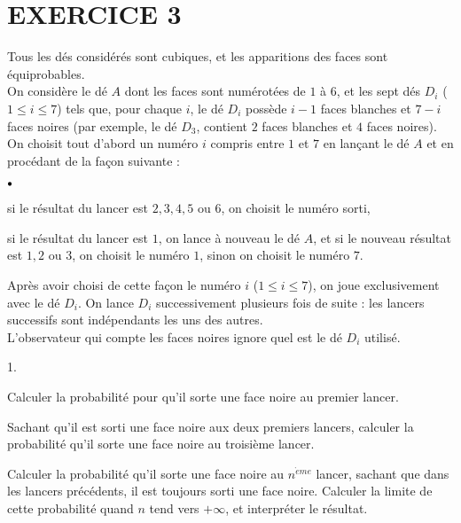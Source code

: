 \documentclass[11pt]{article}%
\begin{document}
\section*{EXERCICE 3}

Tous les dés considérés sont cubiques, et les apparitions des faces
sont équiprobables.\\
On considère le dé $A$ dont les faces sont numérotées de $1$ à $6$, et
les
sept dés $D_{i}$ ($1\leq i\leq 7$) tels que, pour chaque $i$, le dé
$D_{i}$ possède $i-1$ faces blanches et $7-i$ faces noires (par
exemple, le dé $D_{3}$, contient $2$ faces blanches et $4$ faces
noires).\\
On choisit tout d'abord un numéro $i$ compris entre $1$ et $7$ en
lançant le
dé $A$ et en procédant de la façon suivante :

\begin{noliste}{$\scriptstyle \bullet$}
\item si le résultat du lancer est $2,3,4,5$ ou $6$, on choisit le
numéro
sorti,

\item si le résultat du lancer est $1$, on lance à nouveau le dé $A$,
et si
le nouveau résultat est $1,2$ ou $3$, on choisit le numéro $1$, sinon
on
choisit le numéro $7$.
\end{noliste}

\noindent Après avoir choisi de cette façon le numéro $i$ ($1\leq
i\leq 7$), on joue exclusivement avec le dé $D_{i}$. On lance $D_{i}$
successivement plusieurs fois de suite : les lancers successifs sont
indépendants les uns des autres.\\
L'observateur qui compte les faces noires ignore quel est le dé $D_{i}$
utilisé.

\begin{noliste}{1.}
 \setlength{\itemsep}{4mm}
\item Calculer la probabilité pour qu'il sorte une face noire au
premier
lancer.

\item Sachant qu'il est sorti une face noire aux deux premiers lancers,
calculer la probabilité qu'il sorte une face noire au troisième lancer.

\item Calculer la probabilité qu'il sorte une face noire au
$n^{\grave{e}me}$
lancer, sachant que dans les lancers précédents, il est toujours sorti
une
face noire. Calculer la limite de cette probabilité quand $n$ tend vers
$ + \infty $, et interpréter le résultat.
\end{noliste}
\end{document}

